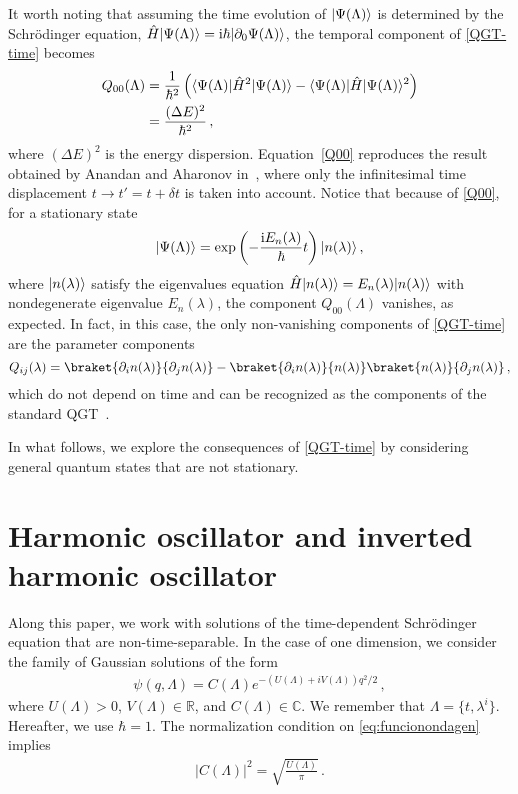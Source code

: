 \documentclass[12pt]{iopart}
\DeclarePairedDelimiter\bra{\langle}{\rvert}
\DeclarePairedDelimiter\ket{\lvert}{\rangle}
\begin{document}
It worth noting that assuming the time evolution of $\ket{\Psi(\Lambda)}$ is determined by the Schr\"{o}dinger equation, $\hat{H}\ket{\Psi(\Lambda)}={\rm i} \hbar \ket{\partial_0 \Psi(\Lambda)}$, the temporal component of \eqref{QGT-time} becomes
\begin{align}
    Q_{00}(\Lambda) &= \frac{1}{\hbar^2} \left( \bra{\Psi(\Lambda)} \hat{H}^2 \ket{\Psi(\Lambda)} - \bra{\Psi(\Lambda)} \hat{H} \ket{\Psi(\Lambda)}^2 \right) \nonumber\\
    &= \frac{(\Delta E)^2}{\hbar^2}\,, \label{Q00}
\end{align}
where $(\Delta E)^2$ is the energy dispersion. Equation~\eqref{Q00} reproduces the result obtained by Anandan and Aharonov in~\cite{Anandan_1990}, where only the infinitesimal time displacement $t \rightarrow t'=t+\delta t$  is taken into account. Notice that because of  \eqref{Q00}, for a stationary state
\begin{equation}\label{eigenkets}
    \ket{\Psi(\Lambda)}=\exp{\left(-\frac{{\rm i} E_n(\lambda)}{\hbar} t \right)} \, \ket{n(\lambda)} \,,
\end{equation}
where $\ket{n(\lambda)}$ satisfy the eigenvalues equation $\hat{H}\ket{n(\lambda)}=E_n(\lambda) \ket{n(\lambda)}$ with nondegenerate eigenvalue $E_n(\lambda)$, the component $Q_{00}(\Lambda)$ vanishes, as expected. In fact, in this case, the only non-vanishing components of \eqref{QGT-time} are the parameter components 
\begin{equation}\label{Qstationary}
    Q_{ij}(\lambda)=\braket{\partial_i n(\lambda)}{\partial_j n(\lambda)} -\braket{\partial_i n(\lambda)}{n(\lambda)}\braket{n(\lambda)}{\partial_j n(\lambda)}\,,
\end{equation}
which do not depend on time and can be recognized as the components of the standard QGT~\cite{Provost}.

In what follows, we explore the consequences of \eqref{QGT-time} by considering general quantum states that are not stationary.

\section{Harmonic oscillator and inverted harmonic oscillator}\label{sec3}

Along this paper, we work with solutions of the time-dependent Schr\"{o}dinger equation that are non-time-separable. In the case of one dimension, we consider the family of Gaussian solutions of the form
\begin{align}
\psi(q,\Lambda) =C(\Lambda)e^{-(U(\Lambda)+iV(\Lambda))q^2/2 }\,,
	\label{eq:funcionondagen}
\end{align}
where  $U(\Lambda)>0$, $V(\Lambda)\in \mathbb{R}$, and $C(\Lambda)\in \mathbb{C}$. We remember that $\Lambda= \{t, \lambda^i\}$. Hereafter, we use $\hbar=1$. The normalization condition on \eqref{eq:funcionondagen} implies
\begin{align}         
|C(\Lambda)|^2=\sqrt{\frac{U(\Lambda)}{\pi}}\,.
\end{align}
\end{document}
